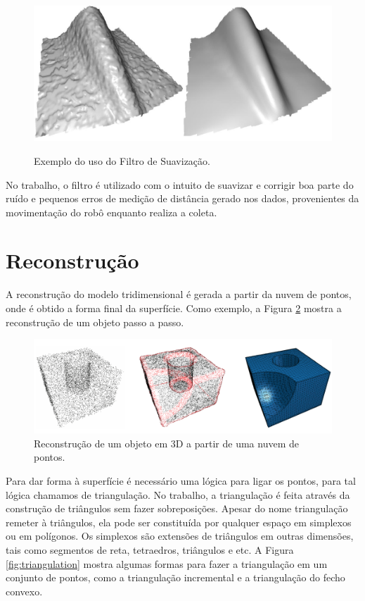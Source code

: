 \begin{figure}[H]
    \centering
    \caption{Exemplo do uso do Filtro de Suavização.}
    \includegraphics[scale=0.3]{dados/figuras/mls_filter.jpg}
    \label{fig:smoothing_filter}
\end{figure}

No trabalho, o filtro é utilizado com o intuito de suavizar e corrigir boa parte do ruído e pequenos erros de medição de distância gerado nos dados, provenientes da movimentação do robô enquanto realiza a coleta.

\section{Reconstrução}
\label{sec:reconstrucao}

A reconstrução do modelo tridimensional é gerada a partir da nuvem de pontos, onde é obtido a forma final da superfície. 
Como exemplo, a Figura \ref{fig:reconstruction} mostra a reconstrução de um objeto passo a passo.

\begin{figure}[H]
    \centering
    \caption{Reconstrução de um objeto em 3D a partir de uma nuvem de pontos.}
    \label{fig:reconstruction}
    \includegraphics[scale=0.8]{dados/figuras/reconstruction.png}
\end{figure}

Para dar forma à superfície é necessário uma lógica para ligar os pontos, para tal lógica chamamos de triangulação.
No trabalho, a triangulação é feita através da construção de triângulos sem fazer sobreposições. 
Apesar do nome triangulação remeter à triângulos, ela pode ser constituída por qualquer espaço em simplexos ou em polígonos. 
Os simplexos são extensões de triângulos em outras dimensões, tais como segmentos de reta, tetraedros, triângulos e etc. 
A Figura \ref{fig:triangulation} mostra algumas formas para fazer a triangulação em um conjunto de pontos, como a triangulação incremental e a triangulação do fecho convexo.

